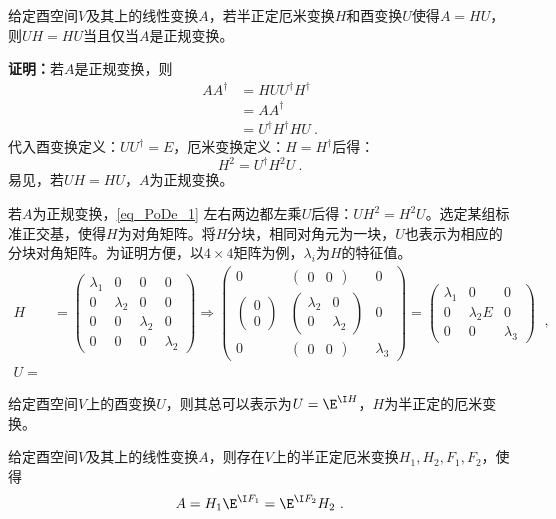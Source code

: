 \begin{theorem}{}
给定酉空间$V$及其上的线性变换$A$，若半正定厄米变换$H$和酉变换$U$使得$A=HU$，则$UH=HU$当且仅当$A$是正规变换。
\end{theorem}
\textbf{证明：}若$A$是正规变换，则
\begin{equation}
\begin{aligned}
AA^{\dagger}&=HUU^{\dagger}H^{\dagger}\\
&=AA^{\dagger}\\
&=U^{\dagger}H^{\dagger}HU~.
\end{aligned}
\end{equation}
代入酉变换定义：$UU^{\dagger}=E$，厄米变换定义：$H=H^{\dagger}$后得：
\begin{equation}\label{eq_PoDe_1}
H^2=U^{\dagger}H^2U~.
\end{equation}
易见，若$UH=HU$，$A$为正规变换。

若$A$为正规变换，\autoref{eq_PoDe_1} 左右两边都左乘$U$后得：$UH^2=H^2U$。选定某组标准正交基，使得$H$为对角矩阵。将$H$分块，相同对角元为一块，$U$也表示为相应的分块对角矩阵。为证明方便，以$4\times 4$矩阵为例，$\lambda_i$为$H$的特征值。
\begin{equation}
\begin{aligned}
H&=\begin{pmatrix}
  \lambda_1&0  & 0 & 0\\
  0& \lambda_2 & 0 & 0\\
 0 &0 &  \lambda_2&0 \\
  0& 0 &0  &\lambda_2
\end{pmatrix}\Rightarrow \begin{pmatrix}
 0&  \begin{pmatrix}
 0 &0
\end{pmatrix}& 0\\
 \begin{pmatrix}
 0\\
0
\end{pmatrix} & \begin{pmatrix}
 \lambda _2 & 0\\
  0& \lambda _2 
\end{pmatrix}  & 0\\
 0 & \begin{pmatrix}
  0&0
\end{pmatrix} &\lambda_3
\end{pmatrix}=\begin{pmatrix}
 \lambda _1 & 0 &0 \\
 0 & \lambda _2E & 0\\
 0 & 0 &\lambda _3
\end{pmatrix}\\
U=
\end{aligned}~,
\end{equation}

\begin{theorem}{}
给定酉空间$V$上的酉变换$U$，则其总可以表示为$U=\E^{\I H}$，$H$为半正定的厄米变换。
\end{theorem}
\begin{corollary}{}
给定酉空间$V$及其上的线性变换$A$，则存在$V$上的半正定厄米变换$H_1,H_2,F_1,F_2$，使得
\begin{equation}
A=H_1\E^{\I F_1}=\E^{\I F_2}H_2~.
\end{equation}
\end{corollary}
